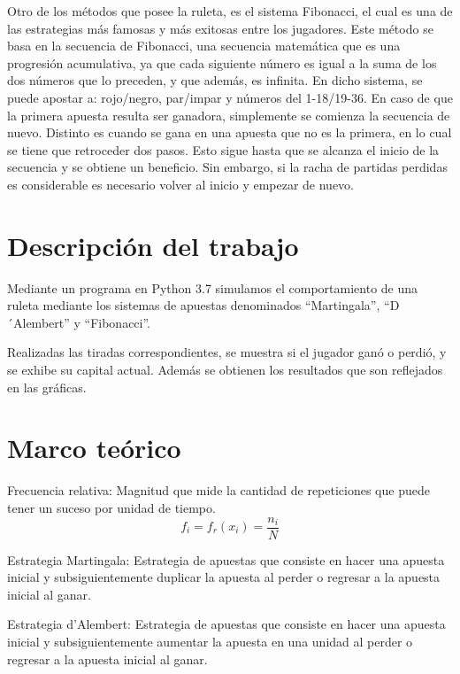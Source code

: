 \documentclass{article}
\begin{document}
    Otro de los métodos que posee la ruleta, es el sistema Fibonacci, el cual es una de las estrategias
    más famosas y más exitosas entre los jugadores. Este método se basa en la secuencia de Fibonacci,
    una secuencia matemática que es una progresión acumulativa,
    ya que cada siguiente número es igual a la suma de los dos números que lo preceden, y que además,
    es infinita. En dicho sistema, se puede apostar a: rojo/negro, par/impar y números del 1-18/19-36.
    En caso de que la primera apuesta resulta ser ganadora, simplemente se comienza la secuencia de nuevo.
    Distinto es cuando se gana en una apuesta que no es la primera, en lo cual se tiene que retroceder dos pasos.
    Esto sigue hasta que se alcanza el inicio de la secuencia y se obtiene un beneficio.
    Sin embargo, si la racha de partidas perdidas es considerable es necesario volver al inicio y
    empezar de nuevo.








    \section{Descripción del trabajo}
    \label{sec:headings}
    Mediante un programa en Python 3.7 simulamos el comportamiento de una ruleta mediante
    los sistemas de apuestas denominados ``Martingala'', ``D´Alembert'' y ``Fibonacci''.

    Realizadas las tiradas correspondientes, se muestra si el jugador ganó o perdió,
    y se exhibe su capital actual. Además se obtienen los resultados que son reflejados en las gráficas.

    \section{Marco teórico}

    Frecuencia relativa: Magnitud que mide la cantidad de repeticiones que puede tener un suceso por unidad de tiempo.
    \begin{equation}
        f_{i} = f_{r}(x_{i}) = \frac {n_{i}}{N}
    \end{equation}

    Estrategia Martingala: Estrategia de apuestas que consiste en hacer una apuesta inicial y subsiguientemente duplicar la apuesta al perder o regresar a la apuesta inicial al ganar.

    Estrategia d'Alembert: Estrategia de apuestas que consiste en hacer una apuesta inicial y subsiguientemente aumentar la apuesta en una unidad al perder o regresar a la apuesta inicial al ganar.
\end{document}
